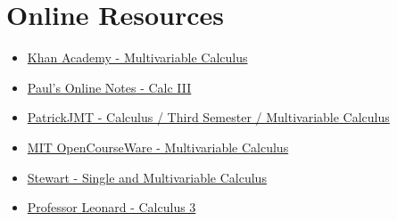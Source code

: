 \section{Online Resources}
\begin{itemize}
	\item \href{https://www.khanacademy.org/math/multivariable-calculus}{Khan Academy - Multivariable Calculus}
	\item \href{http://tutorial.math.lamar.edu/Classes/CalcIII/CalcIII.aspx}{Paul's Online Notes - Calc III}
	\item \href{https://www.youtube.com/playlist?list=PLF83D74BA4DE75897}{PatrickJMT - Calculus / Third Semester / Multivariable Calculus}
	\item \href{https://ocw.mit.edu/courses/mathematics/18-02sc-multivariable-calculus-fall-2010/}{MIT OpenCourseWare - Multivariable Calculus}
	\item \href{https://www.whitman.edu/mathematics/multivariable/multivariable.pdf}{Stewart  - Single and Multivariable Calculus}
	\item \href{https://www.youtube.com/playlist?list=PLDesaqWTN6ESk16YRmzuJ8f6-rnuy0Ry7}{Professor Leonard - Calculus 3}
\end{itemize}